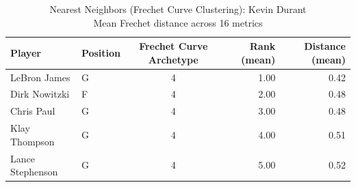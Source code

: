 \begin{table}[t]
\caption*{
{\fontsize{20}{25} Nearest Neighbors (Frechet Curve Clustering): Kevin Durant\fontsize{12}{15}\selectfont } \\ 
{\fontsize{14}{17}\selectfont  Mean Frechet distance across 16 metrics\fontsize{12}{15}\selectfont }
} 
\fontsize{12.0pt}{14.0pt}\selectfont
\begin{tabular*}{\linewidth}{@{\extracolsep{\fill}}llcrr}
\toprule
Player & Position & Frechet Curve Archetype & Rank (mean) & Distance (mean) \\ 
\midrule\addlinespace[2.5pt]
LeBron James & G & 4 & 1.00 & 0.42 \\ 
Dirk Nowitzki & F & 4 & 2.00 & 0.48 \\ 
Chris Paul & G & 4 & 3.00 & 0.48 \\ 
Klay Thompson & G & 4 & 4.00 & 0.51 \\ 
Lance Stephenson & G & 4 & 5.00 & 0.52 \\ 
\bottomrule
\end{tabular*}
\end{table}

